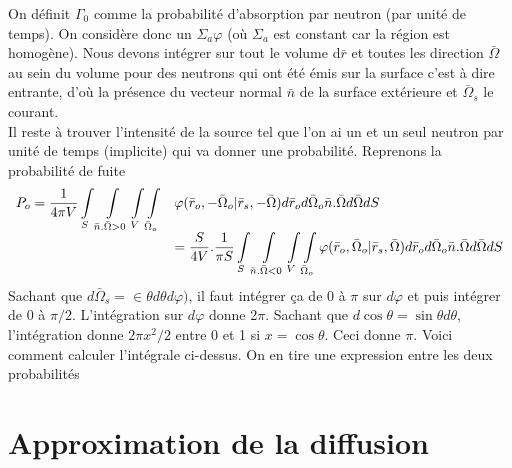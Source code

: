 On définit $\Gamma_0$ comme la probabilité d'absorption par neutron (par unité de temps). On 
considère donc un $\Sigma_a\varphi$ (où $\Sigma_a$ est constant car la région est homogène). Nous 
devons intégrer sur tout le volume d$\bar r$ et toutes les direction $\bar\Omega$ au sein du 
volume pour des neutrons qui ont été émis sur la surface c'est à dire entrante, d'où la présence 
du vecteur normal $\bar n$ de la surface extérieure et $\bar\Omega_s$ le courant.\\

Il reste à trouver l'intensité de la source tel que l'on ai un et un seul neutron par unité de 
temps (implicite) qui va donner une probabilité. Reprenons la probabilité de fuite
\begin{equation}
\begin{array}{ll}
\displaystyle {P_o} = \frac{1}{{4\pi V}}\int\limits_S    \int\limits_{\bar n.\bar \Omega  > 0}    \int\limits_V   \int\limits_{{{\bar \Omega }_o}}&  \displaystyle  \varphi ({\bar r_o}, - {\bar \Omega _o}|{\bar r_s}, - \bar \Omega )d{\bar r_o}d{\bar \Omega _o}\bar n.\bar \Omega d\bar \Omega dS\\ & \displaystyle = \frac{S}{{4V}}.\frac{1}{{\pi S}}\int\limits_S    \int\limits_{\bar n.\bar \Omega  < 0}    \int\limits_V    \int\limits_{{{\bar \Omega }_o}}    \varphi ({\bar r_o},{\bar \Omega _o}|{\bar r_s},\bar \Omega )d{\bar r_o}d{\bar \Omega _o}\bar n.\bar \Omega d\bar \Omega dS
\end{array}
\end{equation}
Sachant que $d\bar\Omega_s = \in\theta d\theta d\varphi)$, il faut intégrer ça de $0$ à $\pi$ sur 
$d\varphi$ et puis intégrer de 0 à $\pi/2$. L'intégration sur $d\varphi$ donne 2$\pi$. Sachant que 
$d\cos\theta = \sin\theta d\theta$, l'intégration donne $2\pi x^2/2$ entre 0 et 1 si $x=\cos\theta$. 
Ceci donne $\pi$. Voici comment calculer l'intégrale ci-dessus. On en tire une expression 
entre les deux probabilités\\



\newpage
\section{Approximation de la diffusion}
